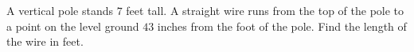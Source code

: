 A vertical pole stands $7$ feet tall. A straight wire runs from the top of the pole to a point on the level ground $43$ inches from the foot of the pole. Find the length of the wire in feet.
